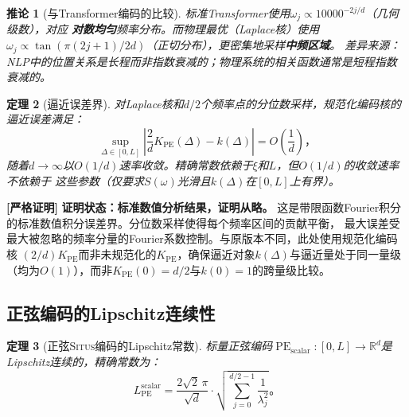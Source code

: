 \documentclass[11pt,a4paper]{article}
\newtheorem{theorem}{定理}[section]
\newtheorem{corollary}[theorem]{推论}
\theoremstyle{remark}
\DeclareMathOperator{\PE}{PE}
\newcommand{\R}{\mathbb{R}}
\newcommand{\Situs}{\textsc{Situs}}
\newcommand{\rigorous}{\textnormal{\textbf{[严格证明]}}}
\begin{document}
\begin{corollary}[与Transformer编码的比较]
\label{cor:1.2.2}
标准Transformer使用$\omega_j \propto 10000^{-2j/d}$（几何级数），对应
\textbf{对数均匀}频率分布。而物理最优（Laplace核）使用
$\omega_j \propto \tan(\pi(2j+1)/2d)$（正切分布），更密集地采样\textbf{中频区域}。
差异来源：NLP中的位置关系是长程而非指数衰减的；物理系统的相关函数通常是短程指数衰减的。
\end{corollary}

\begin{theorem}[逼近误差界]
\label{thm:1.2.2}
对Laplace核和$d/2$个频率点的分位数采样，规范化编码核的逼近误差满足：
\begin{equation}
    \boxed{
    \sup_{\Delta \in [0, L]} \left|\frac{2}{d}K_{\PE}(\Delta) - k(\Delta)\right|
    = O\!\left(\frac{1}{d}\right)
    }，
\end{equation}
随着$d \to \infty$以$O(1/d)$速率收敛。精确常数依赖于$\xi$和$L$，但$O(1/d)$的收敛速率不依赖于
这些参数（仅要求$S(\omega)$光滑且$k(\Delta)$在$[0,L]$上有界）。
\end{theorem}

\rigorous{} \textbf{证明状态：标准数值分析结果，证明从略。}
这是带限函数Fourier积分的标准数值积分误差界。分位数采样使得每个频率区间的贡献平衡，
最大误差受最大被忽略的频率分量的Fourier系数控制。与原版本不同，此处使用规范化编码核
$(2/d)K_{\PE}$而非未规范化的$K_{\PE}$，确保逼近对象$k(\Delta)$与逼近量处于同一量级
（均为$O(1)$），而非$K_{\PE}(0)=d/2$与$k(0)=1$的跨量级比较。

\subsection{正弦编码的Lipschitz连续性}

\begin{theorem}[正弦\Situs{}编码的Lipschitz常数]
\label{thm:1.2.3}
标量正弦编码$\PE_{\text{scalar}}: [0, L] \to \R^d$是Lipschitz连续的，精确常数为：
\begin{equation}
    \boxed{
    L_{\PE}^{\text{scalar}} = \frac{2\sqrt{2}\,\pi}{\sqrt{d}} \cdot \sqrt{\sum_{j=0}^{d/2-1}\frac{1}{\lambda_j^2}}
    }。
\end{equation}
\end{theorem}
\end{document}
